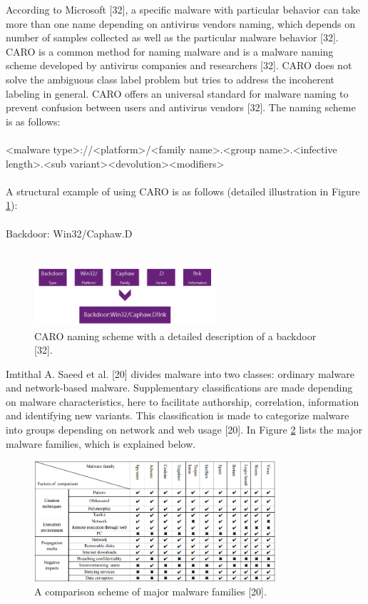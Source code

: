 \documentclass[12pt]{article} %
\begin{document}
According to Microsoft [32], a specific malware with particular behavior can take more than one name depending on antivirus vendors naming, which depends on number of samples collected as well as the particular malware behavior [32]. CARO is a common method for naming malware and is a malware naming scheme developed by antivirus companies and researchers [32]. CARO does not solve the ambiguous class label problem but tries to address the incoherent labeling in general. CARO offers an universal standard for malware naming to prevent confusion between users and antivirus vendors [32]. The naming scheme is as follows: \\ \\
<malware type>://<platform>/<family name>.<group name>.<infective length>.<sub variant><devolution><modifiers>
\\ \\
A structural example of using CARO is as follows (detailed illustration in Figure \ref{fig:malwarenaming}):
\\ \\
Backdoor: Win32/Caphaw.D
\\ \\
\begin{figure}[H]
    \centering
    \includegraphics[width=0.6\textwidth]{malwarenaming}
    \captionsetup{width=0.8\textwidth}
    \caption{CARO naming scheme with a detailed description of a backdoor [32].}
    \label{fig:malwarenaming}
\end{figure}

Imtithal A. Saeed et al. [20] divides malware into two classes: ordinary malware and network-based malware. Supplementary classifications are made depending on malware characteristics, here to facilitate authorship, correlation, information and identifying new variants. This classification is made to categorize malware into groups depending on network and web usage [20]. In Figure \ref{fig:family} lists the major malware families, which is explained below.

\begin{figure}[H]
    \centering
    \includegraphics[width=0.8\textwidth]{family}
    \captionsetup{width=0.8\textwidth}
    \caption{A comparison scheme of major malware families [20].}
    \label{fig:family}
\end{figure}
\end{document}
